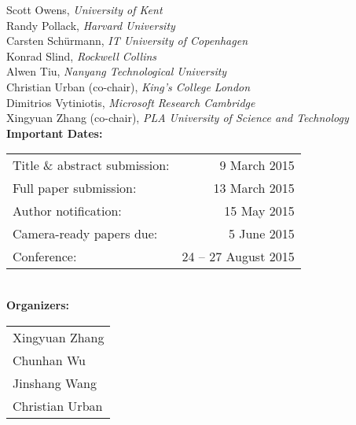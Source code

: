 \documentclass{article}
\begin{document}
\begin{minipage}[t]{6.9cm}
Scott Owens, \emph{University of Kent}\\
Randy Pollack, \emph{Harvard University}\\
Carsten Sch\"urmann, \emph{IT University of Copenhagen}\\
Konrad Slind, \emph{Rockwell Collins}\\
Alwen Tiu, \emph{Nanyang Technological University}\\
Christian Urban (co-chair), \emph{King's College London}\\
Dimitrios Vytiniotis, \emph{Microsoft Research Cambridge}\\
Xingyuan Zhang (co-chair), \emph{PLA University of Science and Technology}    
\\[1em]
%
\textbf{Important Dates:} \\
\begin{tabular}{@{}l@{~~}r@{}}
Title \& abstract submission:        & 9 March 2015\\
Full paper submission:        & 13 March 2015\\
Author notification:     & 15 May 2015\\
Camera-ready papers due: & 5 June 2015\\
Conference:              & 24 -- 27 August 2015\\
\end{tabular}
\\[1em]
\textbf{Organizers:} \\[1ex]
\begin{tabular}{@{}l@{}}
Xingyuan Zhang\\
Chunhan Wu\\
Jinshang Wang\\
Christian Urban\\
\end{tabular}

\end{minipage}
\hspace{3mm}
\end{document}
